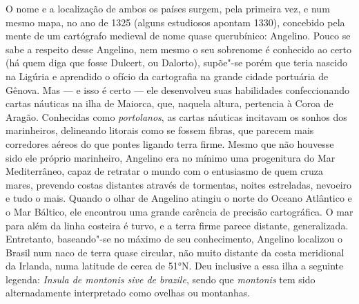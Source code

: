 O nome e a localização de ambos os países surgem, pela primeira vez, e
num mesmo mapa, no ano de 1325 (alguns estudiosos apontam 1330),
concebido pela mente de um cartógrafo medieval de nome quase
querubínico: Angelino. Pouco se sabe a respeito desse Angelino, nem
mesmo o seu sobrenome é conhecido ao certo (há quem diga que fosse
Dulcert, ou Dalorto), supõe"-se porém que teria nascido na Ligúria e
aprendido o ofício da cartografia na grande cidade portuária de Gênova.
Mas --- e isso é certo --- ele desenvolveu suas habilidades confeccionando
cartas náuticas na ilha de Maiorca, que, naquela altura, pertencia à
Coroa de Aragão. Conhecidas como \textit{portolanos}, as cartas náuticas
incitavam os sonhos dos marinheiros, delineando litorais como se fossem
fibras, que parecem mais corredores aéreos do que pontes ligando terra
firme. Mesmo que não houvesse sido ele próprio marinheiro, Angelino era
no mínimo uma progenitura do Mar Mediterrâneo, capaz de retratar o mundo
com o entusiasmo de quem cruza mares, prevendo costas distantes através
de tormentas, noites estreladas, nevoeiro e tudo o mais. Quando o olhar
de Angelino atingiu o norte do Oceano Atlântico e o Mar Báltico, ele
encontrou uma grande carência de precisão cartográfica. O mar para além
da linha costeira é turvo, e a terra firme parece distante,
generalizada. Entretanto, baseando"-se no máximo de seu conhecimento,
Angelino localizou o Brasil num naco de terra quase circular, não muito
distante da costa meridional da Irlanda, numa latitude de cerca de 51°N.
Deu inclusive a essa ilha a seguinte legenda: \textit{Insula de montonis
sive de brazile}, sendo que \textit{montonis} tem sido alternadamente
interpretado como ovelhas ou montanhas.

